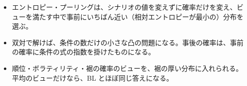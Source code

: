 \begin{keybox}[この章のまとめ]
\begin{itemize}
\item エントロピー・プーリングは、シナリオの値を変えずに確率だけを変え、ビューを満たす中で事前にいちばん近い（相対エントロピーが最小の）分布を選ぶ。
\item 双対で解けば、条件の数だけの小さな凸の問題になる。事後の確率は、事前の確率に条件の式の指数を掛けたものになる。
\item 順位・ボラティリティ・裾の確率のビューを、裾の厚い分布に入れられる。平均のビューだけなら、BL とほぼ同じ答えになる。
\end{itemize}
\end{keybox}
